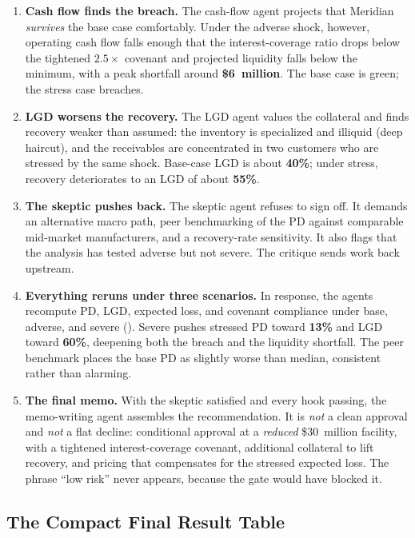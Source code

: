 \begin{enumerate}
\item \textbf{Cash flow finds the breach.} The cash-flow agent projects that
Meridian \emph{survives} the base case comfortably. Under the adverse shock,
however, operating cash flow falls enough that the interest-coverage ratio drops
below the tightened $2.5\times$ covenant and projected liquidity falls below the
minimum, with a peak shortfall around \textbf{\$6~million}. The base case is green;
the stress case breaches.

\item \textbf{LGD worsens the recovery.} The LGD agent values the collateral and
finds recovery weaker than assumed: the inventory is specialized and illiquid (deep
haircut), and the receivables are concentrated in two customers who are stressed by
the same shock. Base-case LGD is about \textbf{40\%}; under stress, recovery
deteriorates to an LGD of about \textbf{55\%}.

\item \textbf{The skeptic pushes back.} The skeptic agent refuses to sign off. It
demands an alternative macro path, peer benchmarking of the PD against comparable
mid-market manufacturers, and a recovery-rate sensitivity. It also flags that the
analysis has tested adverse but not severe. The critique sends work back upstream.

\item \textbf{Everything reruns under three scenarios.} In response, the agents
recompute PD, LGD, expected loss, and covenant compliance under base, adverse, and
severe (). Severe pushes stressed PD toward \textbf{13\%} and
LGD toward \textbf{60\%}, deepening both the breach and the liquidity shortfall. The
peer benchmark places the base PD as slightly worse than median, consistent rather than
alarming.

\item \textbf{The final memo.} With the skeptic satisfied and every hook passing,
the memo-writing agent assembles the recommendation. It is \emph{not} a clean
approval and \emph{not} a flat decline: conditional approval at a \emph{reduced}
\$30~million facility, with a tightened interest-coverage covenant, additional
collateral to lift recovery, and pricing that compensates for the stressed expected
loss. The phrase ``low risk'' never appears, because the gate would have blocked it.
\end{enumerate}

\subsection{The Compact Final Result Table}\label{subsec:credit-table}

